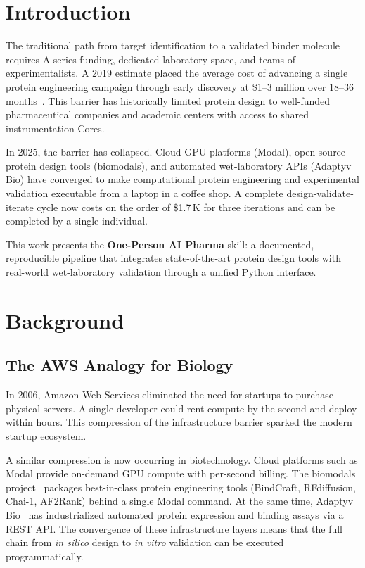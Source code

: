 \documentclass[12pt,a4paper]{article}
\begin{document}
\section{Introduction}

The traditional path from target identification to a validated binder molecule
requires A-series funding, dedicated laboratory space, and teams of
experimentalists. A 2019 estimate placed the average cost of advancing a single
protein engineering campaign through early discovery at \$1--3 million over
18--36 months~\citep{drug_discovery_cost}. This barrier has historically
limited protein design to well-funded pharmaceutical companies and academic
centers with access to shared instrumentation Cores.

In 2025, the barrier has collapsed. Cloud GPU platforms (Modal), open-source
protein design tools (biomodals), and automated wet-laboratory APIs (Adaptyv
Bio) have converged to make computational protein engineering and experimental
validation executable from a laptop in a coffee shop. A complete
design-validate-iterate cycle now costs on the order of \$1.7\,K for three
iterations and can be completed by a single individual.

This work presents the \textbf{One-Person AI Pharma} skill: a documented,
reproducible pipeline that integrates state-of-the-art protein design tools
with real-world wet-laboratory validation through a unified Python interface.

\section{Background}

\subsection{The AWS Analogy for Biology}

In 2006, Amazon Web Services eliminated the need for startups to purchase
physical servers. A single developer could rent compute by the second and deploy
within hours. This compression of the infrastructure barrier sparked the modern
startup ecosystem.

A similar compression is now occurring in biotechnology. Cloud platforms such
as Modal provide on-demand GPU compute with per-second billing. The biomodals
project~\citep{biomodals} packages best-in-class protein engineering tools
(BindCraft, RFdiffusion, Chai-1, AF2Rank) behind a single Modal command. At
the same time, Adaptyv Bio~\citep{adaptyv_bio} has industrialized automated
protein expression and binding assays via a REST API. The convergence of these
infrastructure layers means that the full chain from \emph{in silico} design
to \emph{in vitro} validation can be executed programmatically.
\end{document}
